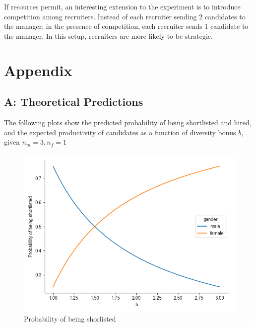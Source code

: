 \documentclass[11pt]{article}
\begin{document}
If resources permit, an interesting extension to the experiment is to introduce competition among recruiters. Instead of each recruiter sending 2 candidates to the manager, in the presence of competition, each recruiter sends 1 candidate to the manager. In this setup, recruiters are more likely to be strategic.

\printbibliography

\section*{Appendix}

\subsection*{A: Theoretical Predictions}

The following plots show the predicted probability of being shortlisted and hired, and the expected productivity of candidates as a function of diversity bonus $b$, given $n_m=3, n_f=1$

\begin{figure}[H] %
    \centering
    \caption{Probability of being shorlisted}
    \includegraphics[width=\textwidth, keepaspectratio]{plots/prob_shortlist.png}

\end{figure}
\end{document}
